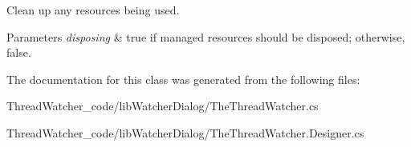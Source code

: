 Clean up any resources being used. 


\begin{DoxyParams}{Parameters}
{\em disposing} & true if managed resources should be disposed; otherwise, false.\\
\hline
\end{DoxyParams}


The documentation for this class was generated from the following files\+:\begin{DoxyCompactItemize}
\item 
Thread\+Watcher\+\_\+code/lib\+Watcher\+Dialog/The\+Thread\+Watcher.\+cs\item 
Thread\+Watcher\+\_\+code/lib\+Watcher\+Dialog/The\+Thread\+Watcher.\+Designer.\+cs\end{DoxyCompactItemize}

